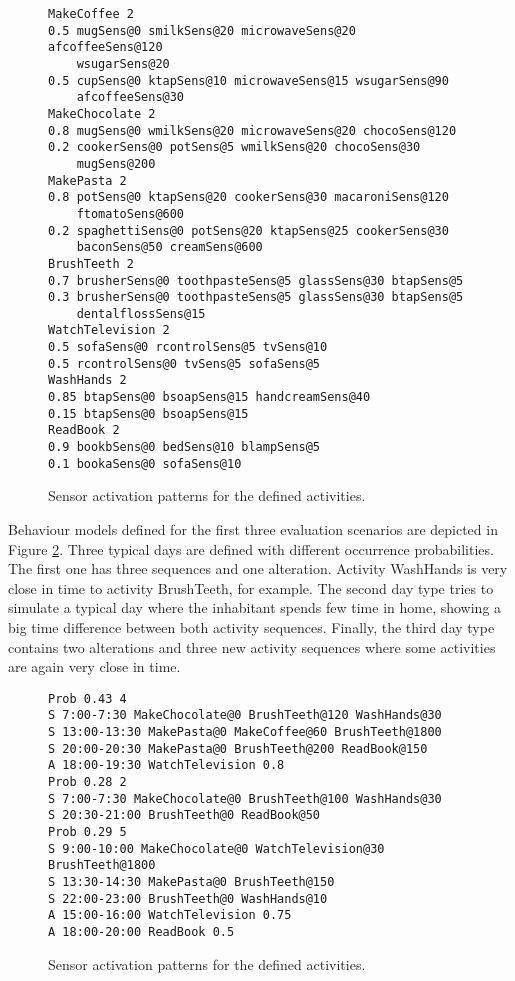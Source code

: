 \begin{figure}
\begin{small}
\lstset{linewidth=\textwidth}
\begin{lstlisting}
MakeCoffee 2
0.5 mugSens@0 smilkSens@20 microwaveSens@20 afcoffeeSens@120 
    wsugarSens@20
0.5 cupSens@0 ktapSens@10 microwaveSens@15 wsugarSens@90 
    afcoffeeSens@30
MakeChocolate 2
0.8 mugSens@0 wmilkSens@20 microwaveSens@20 chocoSens@120
0.2 cookerSens@0 potSens@5 wmilkSens@20 chocoSens@30 
    mugSens@200
MakePasta 2
0.8 potSens@0 ktapSens@20 cookerSens@30 macaroniSens@120 
    ftomatoSens@600
0.2 spaghettiSens@0 potSens@20 ktapSens@25 cookerSens@30 
    baconSens@50 creamSens@600
BrushTeeth 2
0.7 brusherSens@0 toothpasteSens@5 glassSens@30 btapSens@5
0.3 brusherSens@0 toothpasteSens@5 glassSens@30 btapSens@5 
    dentalflossSens@15
WatchTelevision 2
0.5 sofaSens@0 rcontrolSens@5 tvSens@10
0.5 rcontrolSens@0 tvSens@5 sofaSens@5
WashHands 2
0.85 btapSens@0 bsoapSens@15 handcreamSens@40
0.15 btapSens@0 bsoapSens@15
ReadBook 2
0.9 bookbSens@0 bedSens@10 blampSens@5
0.1 bookaSens@0 sofaSens@10
\end{lstlisting}
\end{small}
\caption{Sensor activation patterns for the defined activities.}
\label{fig:basic-script-activities}
\end{figure}

Behaviour models defined for the first three evaluation scenarios are depicted in Figure \ref{fig:basic-script-behaviour}. Three typical days are defined with different occurrence probabilities. The first one has three sequences and one alteration. Activity WashHands is very close in time to activity BrushTeeth, for example. The second day type tries to simulate a typical day where the inhabitant spends few time in home, showing a big time difference between both activity sequences. Finally, the third day type contains two alterations and three new activity sequences where some activities are again very close in time.

\begin{figure}
\begin{small}
\lstset{linewidth=\textwidth}
\begin{lstlisting}
Prob 0.43 4
S 7:00-7:30 MakeChocolate@0 BrushTeeth@120 WashHands@30
S 13:00-13:30 MakePasta@0 MakeCoffee@60 BrushTeeth@1800
S 20:00-20:30 MakePasta@0 BrushTeeth@200 ReadBook@150
A 18:00-19:30 WatchTelevision 0.8
Prob 0.28 2
S 7:00-7:30 MakeChocolate@0 BrushTeeth@100 WashHands@30
S 20:30-21:00 BrushTeeth@0 ReadBook@50
Prob 0.29 5
S 9:00-10:00 MakeChocolate@0 WatchTelevision@30 BrushTeeth@1800
S 13:30-14:30 MakePasta@0 BrushTeeth@150
S 22:00-23:00 BrushTeeth@0 WashHands@10
A 15:00-16:00 WatchTelevision 0.75
A 18:00-20:00 ReadBook 0.5
\end{lstlisting}
\end{small}
\caption{Sensor activation patterns for the defined activities.}
\label{fig:basic-script-behaviour}
\end{figure}

